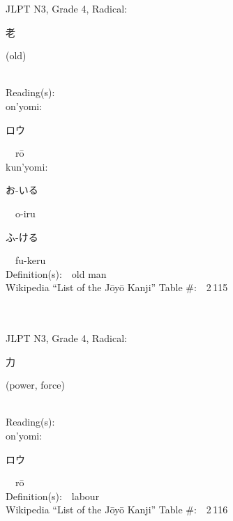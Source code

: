 \begin{multicols}{2}
{JLPT N3, Grade 4, Radical:\ \ {\begin{CJK}{UTF8}{min} 老 \end{CJK}} (old) } \\
Reading(s):\ \ \\
{\hspace*{1em}}on'yomi:\ \ \\
{\hspace*{2em}}{\begin{CJK}{UTF8}{min} ロウ \end{CJK}}\ \ r\=o\ \ \\
{\hspace*{1em}}kun'yomi:\ \ \\
{\hspace*{2em}}{\begin{CJK}{UTF8}{min} お-いる \end{CJK}}\ \ o-iru\ \ \\
{\hspace*{2em}}{\begin{CJK}{UTF8}{min} ふ-ける \end{CJK}}\ \ fu-keru\ \ \\
Definition(s):\ \ old man \\
Wikipedia ``List of the J\=oy\=o Kanji'' Table \#:\ \ 2\,115 \\
\ \ \\
{\fontsize{34pt}{40pt}  }\ \ \\  %
{JLPT N3, Grade 4, Radical:\ \ {\begin{CJK}{UTF8}{min} 力 \end{CJK}} (power, force) } \\
Reading(s):\ \ \\
{\hspace*{1em}}on'yomi:\ \ \\
{\hspace*{2em}}{\begin{CJK}{UTF8}{min} ロウ \end{CJK}}\ \ r\=o\ \ \\
Definition(s):\ \ labour \\
Wikipedia ``List of the J\=oy\=o Kanji'' Table \#:\ \ 2\,116 \\
\ \ \\
{\fontsize{34pt}{40pt}  }\ \ \\  %

\end{multicols}
